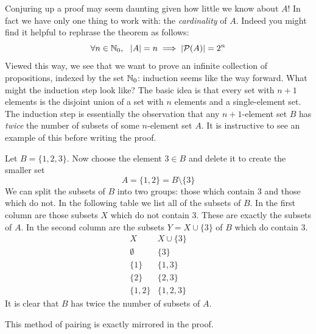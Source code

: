 Conjuring up a proof may seem daunting given how little we know about $A$! In fact we have only one thing to work with: the \emph{cardinality} of $A$. Indeed you might find it helpful to rephrase the theorem as follows:
\[
	\forall n\in\mathbb{N}_0,\ \ \left| A\right|=n\implies \left| \mathcal{P}(A)\right|=2^{n}
\]
Viewed this way, we see that we want to prove an infinite collection of propositions, indexed by the set $\mathbb{N}_0$:  induction seems like the way forward. What might the induction step look like? The basic idea is that every set with $n+1$ elements is the disjoint union of a set with $n$ elements and a single-element set. The induction step is essentially the observation that any $n+1$-element set $B$ has \emph{twice} the number of subsets of some $n$-element set $A$. It is instructive to see an example of this before writing the proof. 

\begin{example}{}{}
	Let $B=\{1,2,3\}$. Now choose the element $3\in B$ and delete it to create the smaller set
	\[
		A=\{1,2\}=B\setminus\{3\}
	\]
	We can split the subsets of $B$ into two groups: those which contain 3 and those which do not. In the following table we list all of the subsets of $B$. In the first column are those subsets $X$ which do not contain 3. These are exactly the subsets of $A$. In the second column are the subsets $Y=X\cup\{3\}$ of $B$ which do contain 3.
	\[
		\begin{array}{c|c}
			X&X\cup\{3\}\\\hline
			\emptyset&\{3\}\\
			\{1\}&\{1,3\}\\
			\{2\}&\{2,3\}\\
			\{1,2\}&\{1,2,3\}
		\end{array}
	\]
	It is clear that $B$ has twice the number of subsets of $A$.
\end{example}

This method of pairing is exactly mirrored in the proof.

